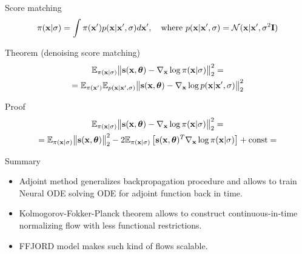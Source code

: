 \begin{frame}{Score matching}
	\[
		\pi(\mathbf{x} | \sigma) = \int \pi(\mathbf{x}') p(\mathbf{x} | \mathbf{x}', \sigma) d\mathbf{x}', \quad \text{where } p(\mathbf{x} | \mathbf{x}', \sigma) = \mathcal{N}(\mathbf{x} | \mathbf{x}', \sigma^2 \mathbf{I})
	\]
	\begin{block}{Theorem (denoising score matching)}
		\begin{multline*}
			\mathbb{E}_{\pi(\mathbf{x} | \sigma)}\bigl\| \mathbf{s}(\mathbf{x}, \boldsymbol{\theta}) - \nabla_{\mathbf{x}} \log \pi(\mathbf{x} | \sigma) \bigr\|^2_2 = \\ = \mathbb{E}_{\pi(\mathbf{x}')} \mathbb{E}_{p(\mathbf{x} | \mathbf{x}', \sigma)}\bigl\| \mathbf{s}(\mathbf{x}, \boldsymbol{\theta}) - \nabla_{\mathbf{x}} \log p(\mathbf{x} | \mathbf{x}', \sigma) \bigr\|^2_2	
		\end{multline*}
	\end{block}
	\begin{block}{Proof}
		\begin{multline*}
			\mathbb{E}_{\pi(\mathbf{x} | \sigma)}\bigl\| \mathbf{s}(\mathbf{x}, \boldsymbol{\theta}) - \nabla_{\mathbf{x}} \log \pi(\mathbf{x} | \sigma) \bigr\|^2_2 = \\ = \mathbb{E}_{\pi(\mathbf{x} | \sigma)}\bigl\| \mathbf{s}(\mathbf{x}, \boldsymbol{\theta}) \bigr\|_2^2 - 2  \mathbb{E}_{\pi(\mathbf{x} | \sigma)} \left[\mathbf{s}(\mathbf{x}, \boldsymbol{\theta})^T \nabla_{\mathbf{x}} \log \pi(\mathbf{x} | \sigma) \right]+ \text{const} = 
		\end{multline*}
	\end{block}
\end{frame}
\begin{frame}{Summary}
	\begin{itemize}
		\item Adjoint method generalizes backpropagation procedure and allows to train Neural ODE solving ODE for adjoint function back in time.
		\vfill
		\item Kolmogorov-Fokker-Planck theorem allows to construct continuous-in-time normalizing flow with less functional restrictions.
		\vfill
		\item FFJORD model makes such kind of flows scalable.
		\vfill
	\end{itemize}
\end{frame}
 